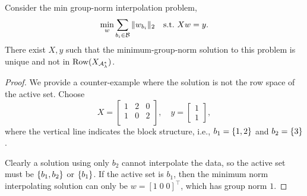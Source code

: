
\begin{proposition}\label{prop:min-norm-interp}
    Consider the min group-norm interpolation problem,
    \[
        \min_{w} \sum_{{b_i} \in \mathcal{B}} \|w_{b_i}\|_2 \quad \text{s.t.} \, \, X w = y.
    \]
    There exist \( X, y \) such that
    the minimum-group-norm solution to this problem
    is unique and not in \( \text{Row}(X_{\mathcal{A}_{\lambda}^{*}}) \).
\end{proposition}
\begin{proof}
    We provide a counter-example where the solution is not the row space of
    the active set.
    Choose
    \[
        X =
        \left[
            \begin{array}{cc|c}
                1 & 2 & 0 \\
                1 & 0 & 2 \\
            \end{array}
            \right],
        \quad
        y = \begin{bmatrix}
            1 \\
            1
        \end{bmatrix},
    \]
    where the vertical line indicates the block structure, i.e.,
    \( b_1 = \left\{1, 2\right\} \) and \( b_2 = \left\{3\right\} \).

    Clearly a solution using only \( b_2 \) cannot interpolate the data,
    so the active set must be \( \left\{b_1, b_2\right\} \)  or \( \left\{b_1\right\} \).
    If the active set is \( b_1 \), then the minimum norm interpolating solution
    can only be \( w = [1 \; 0 \; 0]^\top \), which has group norm \( 1 \).


\end{proof}
